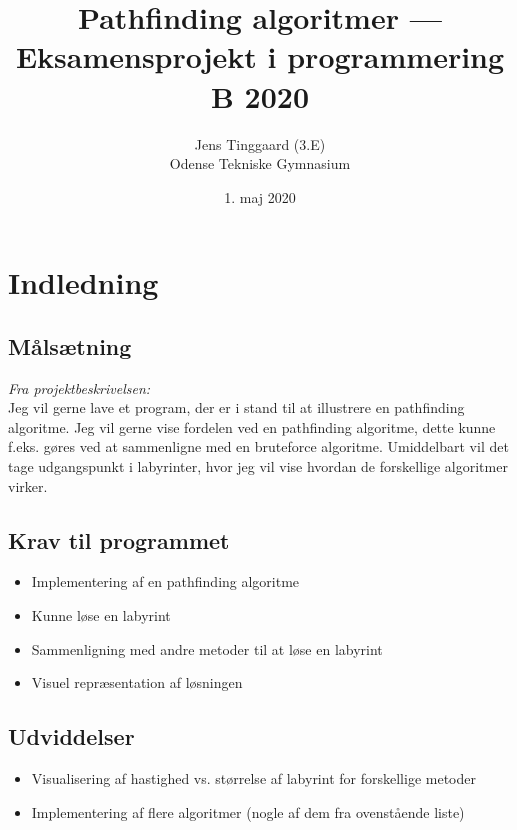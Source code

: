 \documentclass[a4paper, 12pt]{article}
\title{Pathfinding algoritmer --- Eksamensprojekt i programmering B 2020}
\author{Jens Tinggaard (3.E)\\Odense Tekniske Gymnasium}
\date{1. maj 2020}
\begin{document}
\begin{titlepage}
    \maketitle
    \begin{figure}[h]
        \centering
        \resizebox{\textwidth}{!}{}
    \end{figure}

    \thispagestyle{empty} %
\end{titlepage}


\newpage
\tableofcontents


\newpage
\section{Indledning}
\subsection{Målsætning}
\textit{Fra projektbeskrivelsen:}\\
Jeg vil gerne lave et program, der er i stand til at illustrere en pathfinding algoritme. Jeg vil gerne vise fordelen ved en pathfinding algoritme, dette kunne f.eks. gøres ved at sammenligne med en bruteforce algoritme. Umiddelbart vil det tage udgangspunkt i labyrinter, hvor jeg vil vise hvordan de forskellige algoritmer virker.
\subsection{Krav til programmet}
\begin{itemize}
    \item Implementering af en pathfinding algoritme
    \item Kunne løse en labyrint
    \item Sammenligning med andre metoder til at løse en labyrint
    \item Visuel repræsentation af løsningen
\end{itemize}
\subsection{Udviddelser}
\begin{itemize}
    \item Visualisering af hastighed vs. størrelse af labyrint for forskellige metoder
    \item Implementering af flere algoritmer (nogle af dem fra ovenstående liste)
\end{itemize}
\end{document}
